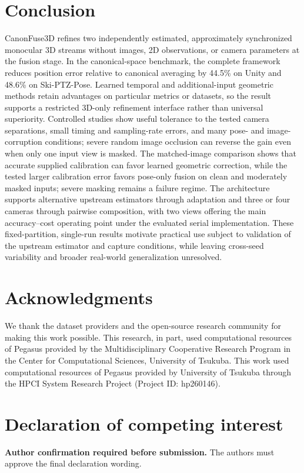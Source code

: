 \documentclass[preprint,12pt]{elsarticle}
\begin{document}
\section{Conclusion}
\label{sec:conclusion}

CanonFuse3D refines two independently estimated, approximately synchronized monocular 3D streams without images, 2D observations, or camera parameters at the fusion stage. In the canonical-space benchmark, the complete framework reduces position error relative to canonical averaging by 44.5\% on Unity and 48.6\% on Ski-PTZ-Pose. Learned temporal and additional-input geometric methods retain advantages on particular metrics or datasets, so the result supports a restricted 3D-only refinement interface rather than universal superiority. Controlled studies show useful tolerance to the tested camera separations, small timing and sampling-rate errors, and many pose- and image-corruption conditions; severe random image occlusion can reverse the gain even when only one input view is masked. The matched-image comparison shows that accurate supplied calibration can favor learned geometric correction, while the tested larger calibration error favors pose-only fusion on clean and moderately masked inputs; severe masking remains a failure regime. The architecture supports alternative upstream estimators through adaptation and three or four cameras through pairwise composition, with two views offering the main accuracy--cost operating point under the evaluated serial implementation. These fixed-partition, single-run results motivate practical use subject to validation of the upstream estimator and capture conditions, while leaving cross-seed variability and broader real-world generalization unresolved.

\section*{Acknowledgments}
We thank the dataset providers and the open-source research community for making this work possible. This research, in part, used computational resources of Pegasus provided by the Multidisciplinary Cooperative Research Program in the Center for Computational Sciences, University of Tsukuba. This work used computational resources of Pegasus provided by University of Tsukuba through the HPCI System Research Project (Project ID: hp260146).

\section*{Declaration of competing interest}
\textbf{Author confirmation required before submission.} The authors must approve the final declaration wording.
\end{document}
